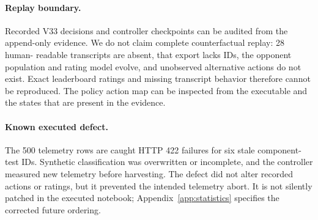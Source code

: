 \paragraph{Replay boundary.}
Recorded V33 decisions and controller checkpoints can be audited from the
append-only evidence. We do not claim complete counterfactual replay: 28 human-
readable transcripts are absent, that export lacks IDs, the opponent population
and rating model evolve, and unobserved alternative actions do not exist.
Exact leaderboard ratings and missing transcript behavior therefore cannot be
reproduced. The policy action map can be inspected from the executable and the
states that are present in the evidence.

\paragraph{Known executed defect.}
The 500 telemetry rows are caught HTTP 422 failures for six stale component-test
IDs. Synthetic classification was overwritten or incomplete, and the controller
measured new telemetry before harvesting. The defect did not alter recorded
actions or ratings, but it prevented the intended telemetry abort. It is not
silently patched in the executed notebook; Appendix~\ref{app:statistics}
specifies the corrected future ordering.
